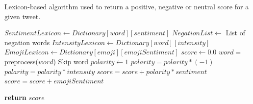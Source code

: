 \begin{algorithm}
  \caption{Lexicon-based algorithm used to return a positive, negative or neutral score for a given tweet.}\label{lexiconAlg}
    \begin{algorithmic}[1]
            \State $SentimentLexicon \gets Dictionary[word][sentiment]$
            \State $NegationList \gets$ List of negation words
            \State $IntensityLexicon \gets Dictionary[word][intensity]$
            \State $EmojiLexicon \gets Dictionary[emoji][emojiSentiment]$ 
            \State $score \gets 0.0$
                \State $word =$ preprocess($word$)
                            \State Skip word
                        \EndIf
                        \EndFor
                \Else
                \State $polarity \gets 1$
                            \State $polarity = polarity * (-1)$
                        \Else
                                \State $polarity = polarity * intensity$
                            \EndIf
                        \EndIf
                    \EndFor
                    \State $score = score + polarity * sentiment$
                \EndIf 
                \Else
                        \State $score = score + emojiSentiment$
                    \EndIf
                \EndIf 

            \EndFor
            \State \textbf{return} $score$
        \EndFunction
    \end{algorithmic}
\end{algorithm}

